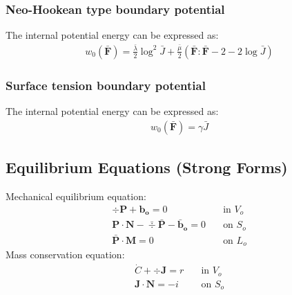 \documentclass[12pt,3p]{article}
\numberwithin{equation}{section}
\begin{document}
\subsubsection{Neo-Hookean type boundary potential}
The internal potential energy can be expressed as: 
\begin{align}\label{neoHookeanPotEnergy}
w_0 (\mathbf{\bar{F}}) = \frac{\bar{\lambda}}{2} \log^2 \bar{J} + \frac{\bar{\mu}}{2} (\mathbf{\bar{F}} : \mathbf{\bar{F}} - 2 - 2 \log \bar{J})
\end{align}

\subsubsection{Surface tension boundary potential}
The internal potential energy can be expressed as: 
\begin{align}\label{STPotEnergy}
w_0 (\mathbf{\bar{F}}) = \gamma \bar{J}
\end{align}


\subsection{Equilibrium Equations (Strong Forms)}
Mechanical equilibrium equation: 
\begin{align*}
\div \mathbf{P} + \mathbf{b_o} = 0 \quad & \text{in } V_o \\
\mathbf{P} \cdot \mathbf{N} - \bar{\div} \mathbf{\bar{P}} - \mathbf{\bar{b}_o} = 0 \quad & \text{on } S_o \\
\mathbf{\bar{P}} \cdot \mathbf{M} = 0 \quad & \text{on } L_o
\end{align*}
Mass conservation equation: 
\begin{align*}
\dot{C} + \div \mathbf{J} = r \quad & \text{in } V_o \\
\mathbf{J} \cdot \mathbf{N} = - i \quad & \text{on } S_o 
\end{align*}

\end{document}
